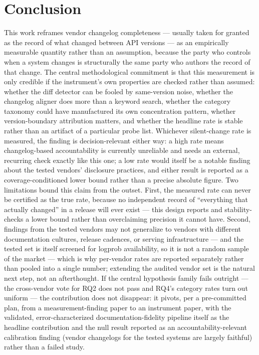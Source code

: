 \documentclass[11pt]{article}
\begin{document}
\section{Conclusion}

This work reframes vendor changelog completeness --- usually taken for granted as the record of what changed between API versions --- as an empirically measurable quantity rather than an assumption, because the party who controls when a system changes is structurally the same party who authors the record of that change. The central methodological commitment is that this measurement is only credible if the instrument's own properties are checked rather than assumed: whether the diff detector can be fooled by same-version noise, whether the changelog aligner does more than a keyword search, whether the category taxonomy could have manufactured its own concentration pattern, whether version-boundary attribution matters, and whether the headline rate is stable rather than an artifact of a particular probe list. Whichever silent-change rate is measured, the finding is decision-relevant either way: a high rate means changelog-based accountability is currently unreliable and needs an external, recurring check exactly like this one; a low rate would itself be a notable finding about the tested vendors' disclosure practices, and either result is reported as a coverage-conditioned lower bound rather than a precise absolute figure. Two limitations bound this claim from the outset. First, the measured rate can never be certified as the true rate, because no independent record of ``everything that actually changed'' in a release will ever exist --- this design reports and stability-checks a lower bound rather than overclaiming precision it cannot have. Second, findings from the tested vendors may not generalize to vendors with different documentation cultures, release cadences, or serving infrastructure --- and the tested set is itself screened for logprob availability, so it is not a random sample of the market --- which is why per-vendor rates are reported separately rather than pooled into a single number; extending the audited vendor set is the natural next step, not an afterthought. If the central hypothesis family fails outright --- the cross-vendor vote for RQ2 does not pass and RQ4's category rates turn out uniform --- the contribution does not disappear: it pivots, per a pre-committed plan, from a measurement-finding paper to an instrument paper, with the validated, error-characterized documentation-fidelity pipeline itself as the headline contribution and the null result reported as an accountability-relevant calibration finding (vendor changelogs for the tested systems are largely faithful) rather than a failed study.
\end{document}
